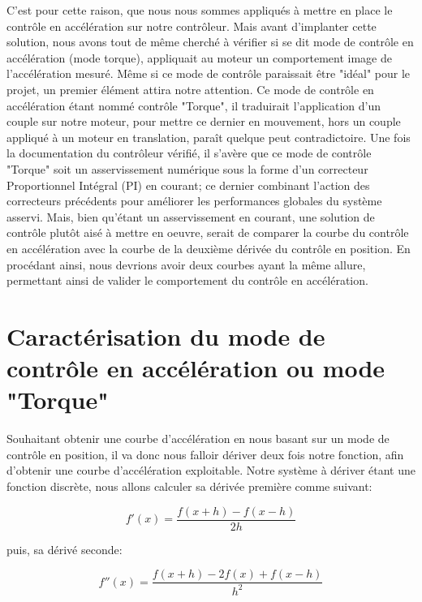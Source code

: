 \documentclass[french,a4paper,12pt]{report}
\begin{document}
	C'est pour cette raison, que nous nous sommes appliqués à mettre en place le contrôle en accélération sur notre contrôleur. Mais avant d'implanter cette solution, nous avons tout de même cherché à vérifier si se dit mode de contrôle en accélération (mode torque), appliquait au moteur un comportement image de l'accélération mesuré. Même si ce mode de contrôle paraissait être "idéal" pour le projet, un premier élément attira notre attention. Ce mode de contrôle en accélération étant nommé contrôle "Torque", il traduirait l'application d'un couple sur notre moteur, pour mettre ce dernier en mouvement, hors un couple appliqué à un moteur en translation, paraît quelque peut contradictoire.
	Une fois la documentation du contrôleur vérifié, il s'avère que ce mode de contrôle "Torque" soit un asservissement numérique sous la forme d'un correcteur Proportionnel Intégral (PI) en courant; ce dernier combinant l'action des correcteurs précédents pour améliorer les performances globales du système asservi. Mais, bien qu'étant un asservissement en courant, une solution de contrôle plutôt aisé à mettre en oeuvre, serait de comparer la courbe du contrôle en accélération avec la courbe de la deuxième dérivée du contrôle en position. En procédant ainsi, nous devrions avoir deux courbes ayant la même allure, permettant ainsi de valider le comportement du contrôle en accélération.
	
	\newpage
	
		\section{Caractérisation du mode de contrôle en accélération ou mode "Torque"}

	Souhaitant obtenir une courbe d'accélération en nous basant sur un mode de contrôle en position, il va donc nous falloir dériver deux fois notre fonction, afin d'obtenir une courbe d'accélération exploitable.
	Notre système à dériver étant une fonction discrète, nous allons calculer sa dérivée première comme suivant: 
	
	\[	
		f'(x) = \frac{f(x+h) - f(x-h)}{2h}
	\]
	
	puis, sa dérivé seconde:
	
	\[	
		f''(x) = \frac{f(x+h) - 2f(x) + f(x-h)}{h^2}
	\]
	
\end{document}
